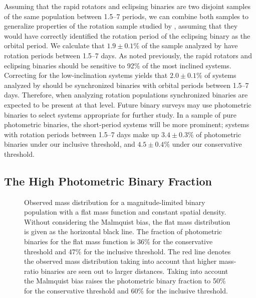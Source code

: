 \documentclass[twocolumn]{aastex6}
\begin{document}
Assuming that the rapid rotators and eclipsing binaries are two disjoint 
samples of the same population between 1.5--7 periods, we can combine both
samples to generalize properties of the rotation sample studied by
\citet{McQuillan14}, assuming that they would have correctly identified the
rotation period of the eclipsing binary as the orbital period. We calculate 
that \(1.9 \pm 0.1\%\) of the sample analyzed by \citep{McQuillan14} have
rotation periods between 1.5--7 days. As noted previously, the
rapid rotators and eclipsing binaries should be sensitive to 92\% of the most
inclined systems. Correcting for the low-inclination systems yields that \(2.0
\pm 0.1\%\) of systems analyzed by \citet{McQuillan14} should be synchronized
binaries with orbital periods between 1.5--7 days. Therefore, when analyzing
rotation populations synchronized binaries are expected to be present at that
level. Future binary surveys may use photometric binaries to select systems
appropriate for further study. In a sample of pure photometric binaries, the 
short-period systems will be more prominent; systems with rotation periods
between 1.5--7 days make up \(3.4 \pm 0.3\%\) of photometric
binaries under our inclusive threshold, and \(4.5 \pm 0.4\%\) under our
conservative threshold.

\subsection{The High Photometric Binary Fraction}

\begin{figure*}[htb]
    \centering
    \caption{Observed mass distribution for a magnitude-limited binary population with a
flat mass function and constant spatial density. Without considering the
Malmquist bias, the flat mass distribution is given as the horizontal black
line. The fraction of photometric binaries for the flat mass function is 36\%
for the conservative threshold and 47\% for the inclusive threshold. The red
line denotes the observed mass distribution taking into account that higher
mass-ratio binaries are seen out to larger distances. Taking into account the
Malmquist bias raises the photometric binary fraction to 50\% for the
conservative threshold and 60\% for the inclusive
threshold.}\label{fig:malmquist}
\end{figure*}
\end{document}
